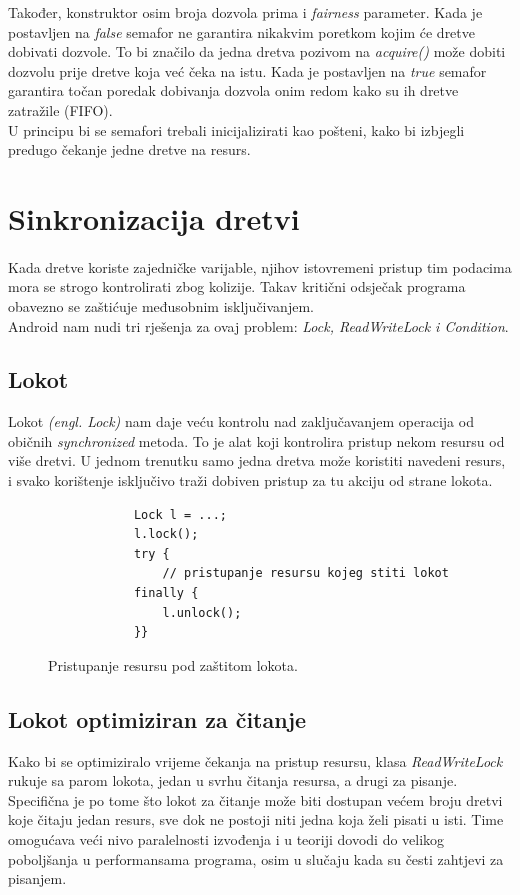 \documentclass[times, utf8, zavrsni]{fer}
\begin{document}
Također, konstruktor osim broja dozvola prima i \textit{fairness} parameter. Kada je postavljen na \textit{false} semafor ne garantira nikakvim poretkom kojim će dretve dobivati dozvole. To bi značilo da jedna dretva pozivom na \textit{acquire()} može dobiti dozvolu prije dretve koja već čeka na istu. Kada je postavljen na \textit{true} semafor garantira točan poredak dobivanja dozvola onim redom kako su ih dretve zatražile (FIFO).\\

U principu bi se semafori trebali inicijalizirati kao pošteni, kako bi izbjegli predugo čekanje jedne dretve na resurs.

\section{Sinkronizacija dretvi}
\paragraph{}
Kada dretve koriste zajedničke varijable, njihov istovremeni pristup tim podacima mora se strogo kontrolirati zbog kolizije. Takav kritični odsječak programa obavezno se zaštićuje međusobnim isključivanjem.\\

Android nam nudi tri rješenja za ovaj problem: \textit{Lock, ReadWriteLock i Condition}.

\subsection{Lokot}
Lokot \textit{(engl. Lock)} nam daje veću kontrolu nad zaključavanjem operacija od običnih \textit{synchronized} metoda. To je alat koji kontrolira pristup nekom resursu od više dretvi. U jednom trenutku samo jedna dretva može koristiti navedeni resurs, i svako korištenje isključivo traži dobiven pristup za tu akciju od strane lokota.

\begin{figure}[ht!]
\begin{lstlisting}
 			Lock l = ...;
 			l.lock();
 			try {
   				// pristupanje resursu kojeg stiti lokot
		  	finally {
		   		l.unlock();
 			}}
\end{lstlisting}
\caption{Pristupanje resursu pod zaštitom lokota.}
\label{overflow}
\end{figure}

\subsection{Lokot optimiziran za čitanje}
Kako bi se optimiziralo vrijeme čekanja na pristup resursu, klasa \textit{ReadWriteLock} rukuje sa parom lokota, jedan u svrhu čitanja resursa, a drugi za pisanje. Specifična je po tome što lokot za čitanje može biti dostupan većem broju dretvi koje čitaju jedan resurs, sve dok ne postoji niti jedna koja želi pisati u isti.
Time omogućava veći nivo paralelnosti izvođenja i u teoriji dovodi do velikog poboljšanja u performansama programa, osim u slučaju kada su česti zahtjevi za pisanjem.
\end{document}
